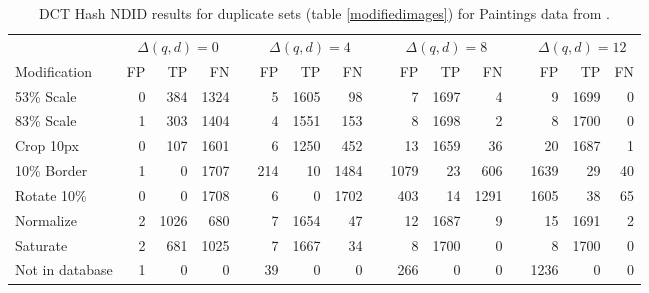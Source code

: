 \documentclass[english,12pt,a4paper,pdftex,elec,utf8, table]{aaltothesis}
\begin{document}
\begin{table}[htb]\footnotesize
\caption{ DCT Hash NDID results for duplicate sets (table \ref{modifiedimages}) for Paintings data from \cite{Vedaldi2012}. }
\label{dctresults}
\begin{center}
  \setlength\tabcolsep{3pt} %
  \begin{tabular}{@{}lrrrrrrrrrrrrrrr@{}}
    \toprule
    & \multicolumn{3}{c}{$\Delta(q,d) = 0$} &\phantom{abc} &\multicolumn{3}{c}{$\Delta(q,d) = 4$} &\phantom{abc} & \multicolumn{3}{c}{$\Delta(q,d)=8$} &\phantom{abc} & \multicolumn{3}{c}{$\Delta(q,d)=12$}\\
\cmidrule{2-4} \cmidrule{6-8} \cmidrule{10-12} \cmidrule{14-16}
    Modification & FP & TP & FN &\phantom{abc} & FP & TP & FN &\phantom{abc} & FP & TP & FN &\phantom{abc} & FP & TP & FN\\ \midrule
    53\% Scale   & 0 & 384 & 1324 &\phantom{abc} & 5 & 1605 & 98 &\phantom{abc} & 7 & 1697 & 4 &\phantom{abc} & 9 & 1699 & 0\\
    83\% Scale   & 1 & 303 & 1404 &\phantom{abc} & 4 & 1551 & 153 &\phantom{abc} & 8 & 1698 & 2 &\phantom{abc} & 8 & 1700 & 0\\
    Crop 10px    & 0 & 107 & 1601 &\phantom{abc} & 6 & 1250 & 452 &\phantom{abc} & 13& 1659 & 36 &\phantom{abc} & 20 & 1687 & 1\\
    10\% Border  & 1 & 0 & 1707 & \phantom{abc} & 214 & 10 & 1484 &\phantom{abc} & 1079 & 23 & 606 &\phantom{abc} & 1639 & 29 & 40\\
    Rotate 10\%  & 0 & 0 & 1708 &\phantom{abc} & 6 & 0 & 1702 &\phantom{abc} & 403 & 14 & 1291 &\phantom{abc} & 1605 & 38 & 65\\
    Normalize    & 2 & 1026 & 680 &\phantom{abc} & 7 & 1654 & 47 &\phantom{abc} & 12 & 1687 & 9 &\phantom{abc} & 15 & 1691 & 2\\
    Saturate     & 2 & 681 & 1025 &\phantom{abc} & 7 & 1667 & 34 &\phantom{abc} & 8 & 1700 & 0 &\phantom{abc} & 8 & 1700 & 0\\
    Not in database & 1 & 0 & 0 &\phantom{abc} & 39 & 0 & 0 &\phantom{abc} & 266 & 0 & 0 &\phantom{abc} & 1236 & 0 & 0\\

    \bottomrule
\end{tabular}
\end{center}
\end{table}
\end{document}
